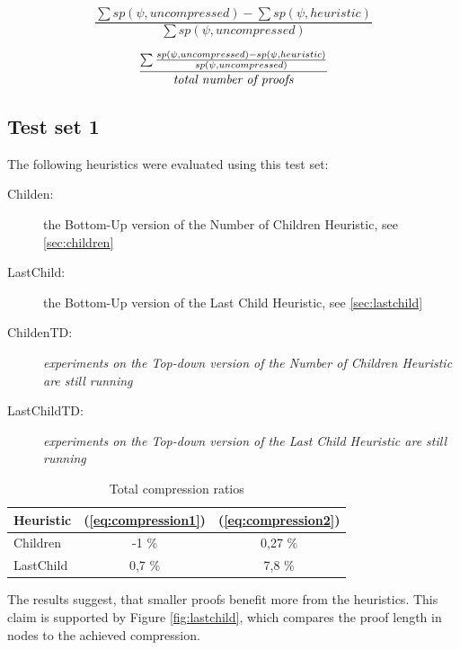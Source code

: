 \documentclass{llncs}
\begin{document}
\begin{equation} \label{eq:compression1}
  \frac{ \sum {sp(\psi,uncompressed)} - \sum{sp(\psi,heuristic)} }{ \sum {sp(\psi,uncompressed)} }
\end{equation}

\begin{equation} \label{eq:compression2}
  \frac{\sum{\frac{ sp(\psi,uncompressed) - sp(\psi,heuristic) }{ sp(\psi,uncompressed) }}}{\text{\emph{total number of proofs}}}
\end{equation}

\subsection{Test set 1}

The following heuristics were evaluated using this test set:
\begin{description}
  \item[Childen:] the Bottom-Up version of the Number of Children Heuristic, see \ref{sec:children}
  \item[LastChild:] the Bottom-Up version of the Last Child Heuristic, see \ref{sec:lastchild}
	\item[ChildenTD:] \emph{experiments on the Top-down version of the Number of Children Heuristic are still running}
	\item[LastChildTD:] \emph{experiments on the Top-down version of the Last Child Heuristic are still running}
\end{description}

 \begin{table}[tb]
   \caption{Total compression ratios}
   \label{tab:average1}
   \centering
   \begin{tabular}{l|c|c}
     \toprule
     Heuristic &  (\ref{eq:compression1}) &  (\ref{eq:compression2})\\
     \midrule
     Children                &  -1 \%  &  0,27 \% \\
     LastChild               &  0,7 \% & 7,8 \% \\
     \bottomrule
   \end{tabular}
 \end{table}

The results suggest, that smaller proofs benefit more from the heuristics.
This claim is supported by Figure \ref{fig:lastchild}, which compares the proof length in nodes to the achieved compression.
\end{document}
